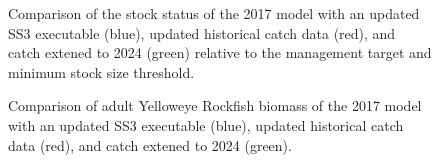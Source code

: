 \documentclass[
]{scrartcl}
\begin{document}
\begin{figure}


\caption{\label{fig-bridge3-comp4}Comparison of the stock status of the
2017 model with an updated SS3 executable (blue), updated historical
catch data (red), and catch extened to 2024 (green) relative to the
management target and minimum stock size threshold.}

\end{figure}%

\begin{figure}


\caption{\label{fig-bridge3-comp18}Comparison of adult Yelloweye
Rockfish biomass of the 2017 model with an updated SS3 executable
(blue), updated historical catch data (red), and catch extened to 2024
(green).}

\end{figure}%
\end{document}
